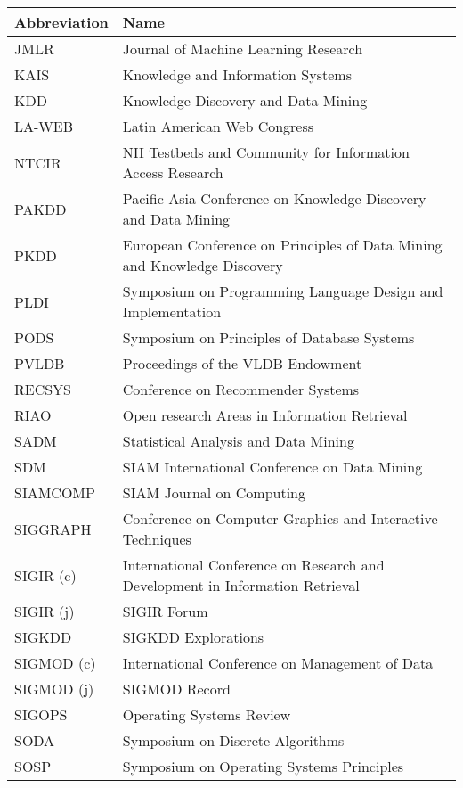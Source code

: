 \begin{table}[h]
\scriptsize
\centering
\begin{tabular}{ll} 
\toprule
Abbreviation & Name          \\
\midrule
JMLR					&		Journal of Machine Learning Research  \\ 
KAIS					&		Knowledge and Information Systems  \\ 
KDD					&		Knowledge Discovery and Data Mining  \\ 
LA-WEB					&		Latin American Web Congress  \\ 
NTCIR					&		NII Testbeds and Community for Information Access Research  \\ 
PAKDD					&		Pacific-Asia Conference on Knowledge Discovery and Data Mining  \\ 
PKDD					&		European Conference on Principles of Data Mining and Knowledge Discovery  \\ 
PLDI					&		Symposium on Programming Language Design and Implementation  \\ 
PODS					&		Symposium on Principles of Database Systems  \\ 
PVLDB					&		Proceedings of the VLDB Endowment  \\ 
RECSYS					&		Conference on Recommender Systems  \\ 
RIAO					&		Open research Areas in Information Retrieval  \\ 
SADM					&		Statistical Analysis and Data Mining  \\ 
SDM					&		SIAM International Conference on Data Mining  \\ 
SIAMCOMP					&		SIAM Journal on Computing  \\ 
SIGGRAPH					&		Conference on Computer Graphics and Interactive Techniques  \\ 
SIGIR (c)					&		International Conference on Research and Development in Information Retrieval  \\ 
SIGIR (j)					&		SIGIR Forum  \\ 
SIGKDD					&		SIGKDD Explorations  \\ 
SIGMOD (c)					&		International Conference on Management of Data  \\ 
SIGMOD (j)					&		SIGMOD Record  \\ 
SIGOPS					&		Operating Systems Review  \\ 
SODA					&		Symposium on Discrete Algorithms  \\ 
SOSP					&		Symposium on Operating Systems Principles  \\ 

\end{tabular}
\end{table}
